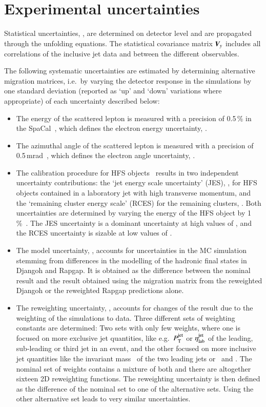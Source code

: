 \documentclass[12pt]{article}
\begin{document}
\section{Experimental uncertainties}
\label{sec:exp_unc}
Statistical uncertainties, \DStat{}, are determined on detector level and are propagated through the unfolding equations.
The statistical covariance matrix $\V_y$ 
includes all correlations of the inclusive jet data and between the different observables.

The following systematic uncertainties are estimated by determining alternative migration matrices, 
i.e.\ by varying the detector response in the simulations by one standard deviation (reported as `up' and `down' variations where appropriate) of each uncertainty described below:
\begin{itemize}

\item The energy of the scattered lepton is measured with a precision of 0.5\,\% in the SpaCal~\cite{DstarF2cc}, which defines the electron energy uncertainty, \DEe{}.

\item The azimuthal angle of the scattered lepton is measured with a precision of 0.5\,mrad~\cite{DstarF2cc}, which defines the electron angle uncertainty, \DThe{}.

\item The calibration procedure for HFS objects~\cite{H1Multijets,ThesisKogler} results in two independent uncertainty contributions:
the `jet energy scale uncertainty' (JES), \DJES{}, for HFS objects contained in a laboratory jet with high transverse momentum, 
and the `remaining cluster energy scale' (RCES) for the remaining clusters, \DHFS{}. 
Both uncertainties are determined by varying the energy of the HFS object by 1\,\%~\cite{H1Multijets}.
The JES uncertainty is a dominant uncertainty at high values of \pt, and the RCES uncertainty is sizable at low values of \pt.

\item The model uncertainty, \DMod{}, accounts for uncertainties in
  the MC simulation stemming from differences in the modelling of the
  hadronic final states in Djangoh and Rapgap. 
  It is obtained as the difference between the nominal result and the result obtained using the migration matrix from the reweighted Djangoh or the reweighted Rapgap predictions alone.

\item The reweighting uncertainty, \DModRW{}, accounts for changes of the result due to the weighting of the simulations to data. 
Three different sets of weighting constants are determined: 
Two sets with only few weights, where one is focused on more exclusive jet quantities, like e.g.\ $\ptjet$ or $\etalab$ of the leading, sub-leading or third jet in an event, and the other focused on more inclusive jet quantities like the invariant mass \Mjj\ of the two leading jets or \meanptdi\ and \meanpttri.
The nominal set of weights contains a mixture of both and there are altogether sixteen 2D reweighting functions.
The reweighting uncertainty is then defined as the difference of the nominal set to one of the alternative sets.
Using the other alternative set leads to very similar uncertainties.


\end{itemize}
\end{document}
